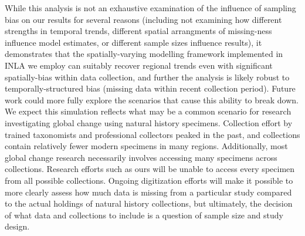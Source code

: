 \documentclass[11pt]{article}
\begin{document}
{While this analysis is not an exhaustive examination of the influence of sampling bias on our results for several reasons (including not examining how different strengths in temporal trends, different spatial arrangments of missing-ness influence model estimates, or different sample sizes influence results), it demonstrates that the spatially-varying modelling framework implemented in INLA we employ can suitably recover regional trends even with significant spatially-bias within data collection, and further the analysis is likely robust to temporally-structured bias (missing data within recent collection period). 
Future work could more fully explore the scenarios that cause this ability to break down. 
We expect this simulation reflects what may be a common scenario for research investigating global change using natural history specimens. 
Collection effort by trained taxonomists and professional collectors peaked in the past, and collections contain relatively fewer modern specimens in many regions. 
Additionally, most global change research necessarily involves accessing many specimens across collections.
Research efforts such as ours will be unable to access every specimen from all possible collections. 
Ongoing digitization efforts will make it possible to more clearly assess how much data is missing from a particular study compared to the actual holdings of natural history collections, but ultimately, the decision of what data and collections to include is a question of sample size and study design.
}

	

	

	
\end{document}
